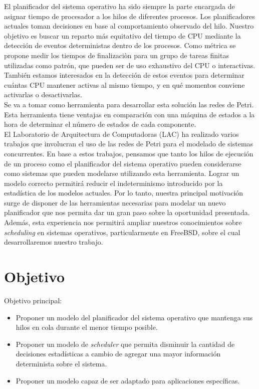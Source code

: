 \documentclass[a4paper]{book}
\begin{document}
El planificador del sistema operativo ha sido siempre la parte encargada de asignar tiempo de procesador a los hilos de diferentes procesos. Los planificadores actuales toman decisiones en base al comportamiento observado del hilo. Nuestro objetivo es buscar un reparto m\'as equitativo del tiempo de CPU mediante la detecci\'on de eventos deterministas dentro de los procesos. Como métrica se propone medir los tiempos de finalizaciòn para un grupo de tareas finitas utilizadas como patrón, que pueden ser de uso exhaustivo del CPU o interactivas. Tambi\'en estamos interesados en la detecci\'on de estos eventos para determinar cuántas CPU mantener activas al mismo tiempo, y en qué momentos conviene activarlas o desactivarlas.\\

Se va a tomar como herramienta para desarrollar esta soluci\'on las redes de Petri. Esta herramienta tiene ventajas en comparaci\'on con una m\'aquina de estados a la hora de determinar el n\'umero de estados de cada componente.\\

El Laboratorio de Arquitectura de Computadoras (LAC) ha realizado varios trabajos que involucran el uso de las redes de Petri para el modelado de sistemas concurrentes. En base a estos trabajos, pensamos que tanto los hilos de ejecución de un proceso como el planificador del sistema operativo pueden considerarse como sistemas que pueden modelarse utilizando esta herramienta. Lograr un modelo correcto permitir\'a reducir el indeterminismo introducido por la estad\'istica de los modelos actuales. Por lo tanto, nuestra principal motivación surge de disponer de las herramientas necesarias para modelar un nuevo planificador que nos permita dar un gran paso sobre la oportunidad presentada. Además, esta experiencia nos permitirá ampliar nuestros conocimientos sobre \emph{scheduling} en sistemas operativos, particularmente en FreeBSD, sobre el cual desarrollaremos nuestro trabajo.

\section{Objetivo}

Objetivo principal:
\begin{itemize}
\item Proponer un modelo del planificador del sistema operativo que mantenga sus hilos en cola durante el menor tiempo posible.\\

\item Proponer un modelo de \emph{scheduler} que permita disminuir la cantidad de decisiones estadísticas a cambio de agregar una mayor información determinista sobre el sistema.

\item Proponer un modelo capaz de ser adaptado para aplicaciones específicas.

\end{itemize}
\end{document}
